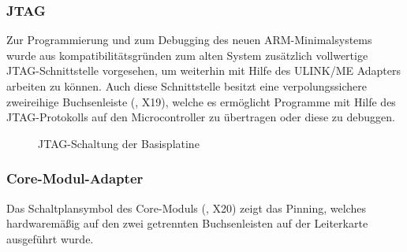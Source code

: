 \subsubsection{JTAG}
Zur Programmierung und zum \gls{Debugging} des neuen \gls{ARM}-\gls{Minimalsystem}s wurde aus kompatibilitätsgründen zum alten System zusätzlich vollwertige JTAG-Schnittstelle vorgesehen, um weiterhin mit Hilfe des ULINK/ME Adapters arbeiten zu können. Auch diese Schnittstelle besitzt eine verpolungssichere zweireihige Buchsenleiste (, X19), welche es ermöglicht Programme mit Hilfe des JTAG-Protokolls auf den Microcontroller zu übertragen oder diese zu debuggen.

\begin{figure}[htb]
    \centering
    \qquad
    \qquad
    \caption[JTAG-Schaltung der Basisplatine]{JTAG-Schaltung der \gls{Basisplatine}}
    \label{fig:basisplatine-jtag}
\end{figure}

\subsubsection{Core-Modul-Adapter}
Das Schaltplansymbol des \gls{Core-Modul}s (, X20) zeigt das Pinning, welches hardwaremäßig auf den zwei getrennten Buchsenleisten auf der Leiterkarte ausgeführt wurde.

